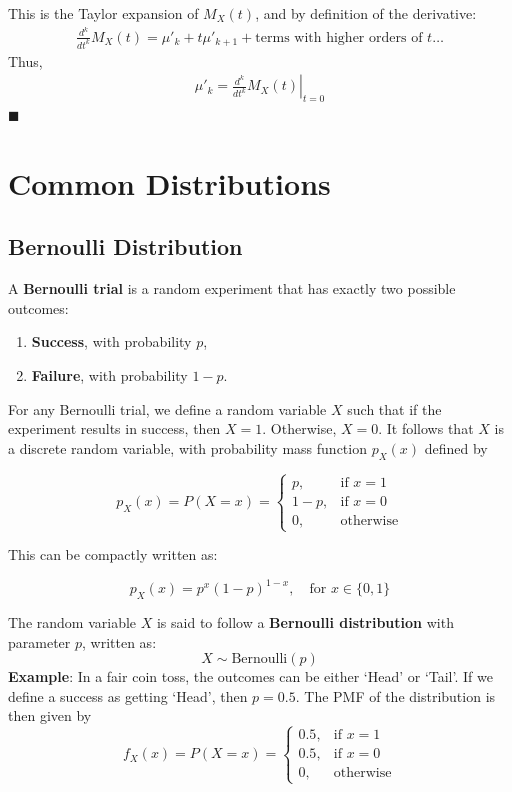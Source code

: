 \documentclass[twoside]{book}
\begin{document}
This is the Taylor expansion of \( M_X(t) \), and by definition of the derivative:
\begin{align*}
    \frac{d^k}{dt^k} M_X(t) = \mu'_k + t\mu'_{k+1} + \text{terms with higher orders of }t \dots
\end{align*}
Thus,
\begin{align*}
    \mu'_k = \left. \frac{d^k}{dt^k} M_X(t) \right|_{t=0}
\end{align*}
\hfill\(\blacksquare\)


\chapter{Common Distributions}

\section{Bernoulli Distribution}

A \textbf{Bernoulli trial} is a random experiment that has exactly two possible outcomes:
\begin{enumerate}
    \item \textbf{Success}, with probability $p$,
    \item \textbf{Failure}, with probability $1 - p$.
\end{enumerate}

For any Bernoulli trial, we define a random variable $X$ such that if the experiment results in success, then $X = 1$. Otherwise, $X = 0$. It follows that $X$ is a discrete random
variable, with probability mass function $p_X(x)$ defined by

\begin{textbox}
    \[
p_X(x) = P(X = x) =
\begin{cases}
p, & \text{if } x = 1 \\
1 - p, & \text{if } x = 0 \\
0, & \text{otherwise}
\end{cases}
\]
\end{textbox}

This can be compactly written as:
\begin{textbox}
    \[
p_X(x) = p^x (1 - p)^{1 - x}, \quad \text{for } x \in \{0, 1\}
\]
\end{textbox}

The random variable $X$ is said to follow a \textbf{Bernoulli distribution} with parameter $p$, written as:
\[
X \sim \text{Bernoulli}(p)
\]
\textbf{Example}: In a fair coin toss, the outcomes can be either `Head' or `Tail'. If we define a success as getting `Head', then $p = 0.5$. The PMF of the distribution is then given by
\[
f_X(x) = P(X = x) =
\begin{cases}
0.5, & \text{if } x = 1 \\
0.5, & \text{if } x = 0 \\
0, & \text{otherwise}
\end{cases}
\]
\end{document}
